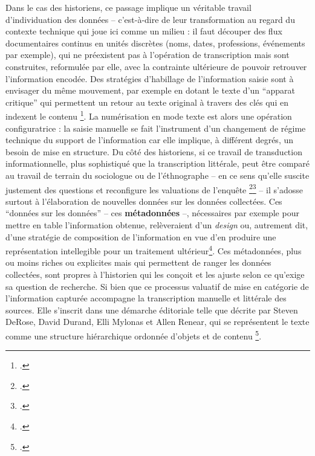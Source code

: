 Dans le cas des historiens, ce passage implique un véritable travail d’individuation des données -- c'est-à-dire de leur transformation au regard du contexte technique qui joue ici comme un milieu : il faut découper des flux documentaires continus en unités discrètes (noms, dates, professions, événements par exemple), qui ne préexistent pas à l’opération de transcription mais sont construites, reformulée par elle, avec la contrainte ultérieure de pouvoir retrouver l'information encodée. Des stratégies d'habillage de l'information saisie sont à envisager du même mouvement, par exemple en dotant le texte d'un \enquote{apparat critique} qui permettent un retour au texte original à travers des clés qui en indexent le contenu \footcite[][]{vancampenhoudt}. La numérisation en mode texte est alors une opération configuratrice : la saisie manuelle se fait l’instrument d’un changement de régime technique du support de l'information car elle implique, à différent degrés, un besoin de mise en structure. Du côté des historiens, si ce travail de transduction informationnelle, plus sophistiqué que la transcription littérale, peut être comparé au travail de terrain du sociologue ou de l'éthnographe -- en ce sens qu'elle suscite justement des questions et reconfigure les valuations de l'enquête \footcite[][]{zalc}\footcite[][]{dewey} -- il s'adosse surtout à l'élaboration de nouvelles données sur les données collectées. Ces \enquote{données sur les données} -- ces \textbf{métadonnées} --, nécessaires par exemple pour mettre en table l'information obtenue, relèveraient d'un \emph{design} ou, autrement dit, d'une stratégie de composition de l'information en vue d'en produire une représentation intellegible pour un traitement ultérieur\footcite[][]{renon}. Ces métadonnées, plus ou moins riches ou explicites mais qui permettent de ranger les données collectées, sont propres à l'historien qui les conçoit et les ajuste selon ce qu'exige sa question de recherche. Si bien que ce processus valuatif de mise en catégorie de l'information capturée accompagne la transcription manuelle et littérale des sources. Elle s'inscrit dans une démarche éditoriale telle que décrite par Steven DeRose, David Durand, Elli Mylonas et Allen Renear, qui se représentent le texte comme une structure hiérarchique ordonnée d'objets et de contenu \footcite[][]{derose}. 

